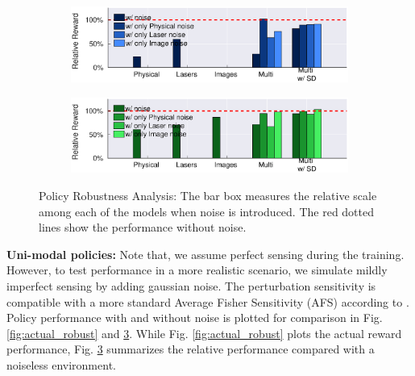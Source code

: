 \documentclass[../thesis.tex]{subfiles}
\begin{document}
\begin{figure}[t]
    \centering
    \begin{subfigure}[b]{0.48\linewidth}
        \includegraphics[width=\columnwidth,trim= 45 180 45 25, clip=true]{./MultimodalDRL/fig/relative_robust_naf}
        \label{fig:relative_robust_naf}
    \end{subfigure}
    \begin{subfigure}[b]{0.48\linewidth}
        \includegraphics[width=\columnwidth,trim= 45 180 45 25, clip=true]{./MultimodalDRL/fig/relative_robust_ddpg}
        \label{fig:relative_robust_ddpg}
    \end{subfigure}
    \caption{Policy Robustness Analysis: The bar box measures the relative scale among each of the models when noise is introduced. The red dotted lines show the performance without noise.}
    \label{fig:relative_robust}
\end{figure}

\textbf{Uni-modal policies:} 
Note that, we assume perfect sensing during the training. However, to test performance in a more realistic scenario, we simulate mildly imperfect sensing by adding gaussian noise. The perturbation sensitivity is compatible with a more standard Average Fisher Sensitivity (AFS) according to \cite{progressive_net}. Policy performance with and without noise is plotted for comparison in Fig. \ref{fig:actual_robust} and \ref{fig:relative_robust}. While Fig. \ref{fig:actual_robust} plots the actual reward performance, Fig. \ref{fig:relative_robust} summarizes the relative performance compared with a noiseless environment. 
\end{document}
